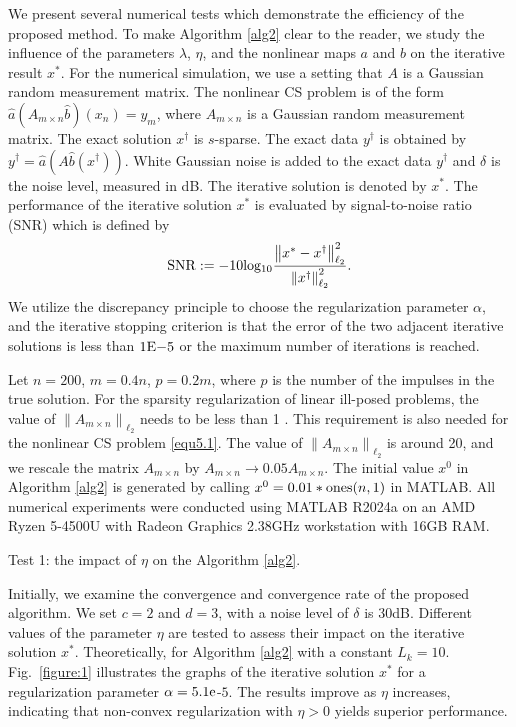 \documentclass[a4paper,12pt]{article}
\numberwithin{equation}{section}
\begin{document}
\par We present several numerical tests which demonstrate the efficiency of the proposed method. To make Algorithm \ref{alg2} clear to the reader, we study the influence of the parameters $\lambda$, $\eta$, and the nonlinear maps $a$ and $b$ on the iterative result $x^{*}$. For the numerical simulation, we use a setting that $A$ is a Gaussian random measurement matrix. The nonlinear CS problem is of the form $\hat{a}\left(A_{m\times n}\hat{b}\right)\left(x_{n}\right)=y_{m}$, where $A_{m\times n}$ is a Gaussian random measurement matrix. The exact solution $x^{\dagger}$ is $s$-sparse. The exact data $y^{\dagger}$ is obtained by $y^{\dagger}=\hat{a}\left(A\hat{b}\left(x^{\dagger}\right)\right)$. White Gaussian noise  is added to the exact data $y^{\dagger}$ and $\delta$ is the noise level, measured in dB. The iterative solution is denoted by $x^{*}$. The performance of the iterative solution $x^{*}$ is evaluated by signal-to-noise ratio (SNR) which is defined by
\begin{equation*}
    {\rm SNR}:= -10{\rm log_{10}}\frac{\left\|x^{*}-x^{\dagger}\right\|_{\ell_{2}}^{2}} {\left\|x^{\dagger}\right\|_{\ell_{2}}^{2}}.
\end{equation*}
We utilize the discrepancy principle to choose the regularization parameter $\alpha$, and the iterative stopping criterion is that the error of the two adjacent iterative solutions is less than $1{\rm E-}5$ or the maximum number of iterations is reached.

\par Let $n=200$, $m=0.4n$, $p=0.2m$, where $p$ is the number of the impulses in the true  solution. For the sparsity regularization of linear ill-posed problems, the value of $\left\|A_{m\times n}\right\|_{\ell_{2}}$ needs to be less than 1 \cite{DDD04}. This requirement is also needed for the nonlinear CS problem \eqref{equ5.1}. The value of $\left\|A_{m\times n}\right\|_{\ell_{2}}$ is around 20, and we rescale the matrix $A_{m\times n}$ by $A_{m\times n}\rightarrow 0.05A_{m\times n}$. The initial value $x^{0}$ in Algorithm \ref{alg2} is generated by calling $x^{0}=0.01*{\rm ones}(n,1)$ in MATLAB. All numerical experiments were conducted using MATLAB R2024a on an AMD Ryzen 5-4500U with Radeon Graphics 2.38GHz workstation with 16GB RAM.

\par Test 1: the impact of $\eta$ on the Algorithm \ref{alg2}.

\par Initially, we examine the convergence and convergence rate of the proposed algorithm. We set $c=2$ and $d=3$, with a noise level of $\delta$ is 30dB. Different values of the parameter $\eta$ are tested to assess their impact on the iterative solution $x^{*}$. Theoretically, for Algorithm \ref{alg2} with a constant $L_{k}=10$. Fig.\ \ref{figure:1}  illustrates the graphs of the iterative solution $x^{*}$  for a regularization parameter $\alpha=5.1{\rm e}$-$5$. The results improve as $\eta$ increases, indicating that non-convex regularization with $\eta>0$ yields superior performance.
\end{document}
